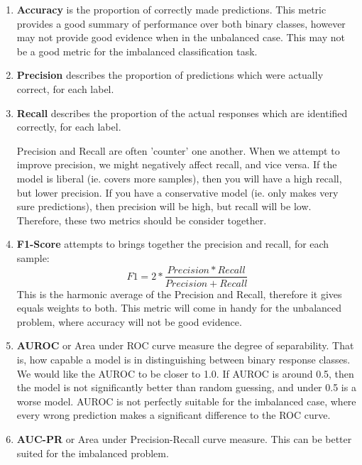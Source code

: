 \documentclass{article}
\begin{document}
\begin{enumerate}

\item{}
\textbf{Accuracy} is the proportion of correctly made predictions. This metric provides a good summary of performance over both binary classes, however may not provide good evidence when in the unbalanced case. This may not be a good metric for the imbalanced classification task.
    
\item{}
\textbf{Precision} describes the proportion of predictions which were actually correct, for each label.
    
\item{}
\textbf{Recall} describes the proportion of the actual responses which are identified correctly, for each label.

Precision and Recall are often 'counter' one another. When we attempt to improve precision, we might negatively affect recall, and vice versa. If the model is liberal (ie. covers more samples), then you will have a high recall, but lower precision. If you have a conservative model (ie. only makes very sure predictions), then precision will be high, but recall will be low. Therefore, these two metrics should be consider together.

\item{}
\textbf{F1-Score} attempts to brings together the precision and recall, for each sample:
\begin{equation}
    F1 = 2 * \frac{Precision* Recall}{Precision+Recall} 
\end{equation}
This is the harmonic average of the Precision and Recall, therefore it gives equals weights to both. This metric will come in handy for the unbalanced problem, where accuracy will not be good evidence.

\item{}
\textbf{AUROC} or Area under ROC curve measure the degree of separability. That is, how capable a model is in distinguishing between binary response classes. We would like the AUROC to be closer to 1.0. If AUROC is around 0.5, then the model is not significantly better than random guessing, and under 0.5 is a worse model. AUROC is not perfectly suitable for the imbalanced case, where every wrong prediction makes a significant difference to the ROC curve. 
\item{}
\textbf{AUC-PR} or Area under Precision-Recall curve measure. This can be better suited for the imbalanced problem.
\end{enumerate}
\end{document}
